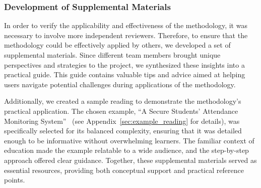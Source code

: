 \subsubsection{Development of Supplemental Materials}
\label{sec:credal:dev:2}

In order to verify the applicability and effectiveness of the methodology, it was necessary to involve more independent reviewers.
Therefore, to ensure that the methodology could be effectively applied by others, we developed a set of supplemental materials. Since different team members brought unique perspectives and strategies to the project, we synthesized these insights into a practical guide. This guide contains valuable tips and advice aimed at helping users navigate potential challenges during applications of the methodology.

Additionally, we created a sample reading to demonstrate the methodology’s practical application. The chosen example, ``A Secure Students’ Attendance Monitoring System''~\cite{erd} (see Appendix~\ref{sec:example_reading} for details), was specifically selected for its balanced complexity, ensuring that it was detailed enough to be informative without overwhelming learners. The familiar context of education made the example relatable to a wide audience, and the step-by-step approach offered clear guidance. Together, these supplemental materials served as essential resources, providing both conceptual support and practical reference points.


